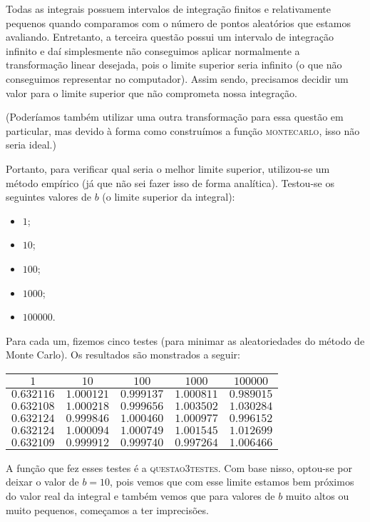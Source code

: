 \documentclass[12pt, a4paper, oneside]{article}
\begin{document}
Todas as integrais possuem intervalos de integração finitos e relativamente 
pequenos quando comparamos com o número de pontos aleatórios que estamos 
avaliando. Entretanto, a terceira questão possui um intervalo de integração
infinito e daí simplesmente não conseguimos aplicar normalmente a transformação
linear desejada, pois o limite superior seria infinito (o que não conseguimos
representar no computador). Assim sendo, precisamos decidir um valor para o limite
superior que não comprometa nossa integração.

(Poderíamos também utilizar uma outra transformação para essa questão em particular,
mas devido à forma como construímos a função \textsc{montecarlo}, isso não seria
ideal.)

Portanto, para verificar qual seria o melhor limite superior, utilizou-se um 
método empírico (já que não sei fazer isso de forma analítica). Testou-se 
os seguintes valores de $b$ (o limite superior da integral):
\begin{itemize}
\item $1$;
\item $10$;
\item $100$;
\item $1000$;
\item $100000$.
\end{itemize}

Para cada um, fizemos cinco testes (para minimar as aleatoriedades do método de
Monte Carlo). Os resultados são monstrados a seguir:

\begin{center}
\begin{tabular}{|| c c c c c ||}
\hline
$1$ & $10$ & $100$ & $1000$ & $100000$ \\ [0.5ex]
\hline\hline
$0.632116$ & $1.000121$ & $0.999137$ & $1.000811$ & $0.989015$ \\ [0.1ex]
\hline
$0.632108$ & $1.000218$ & $0.999656$ & $1.003502$ & $1.030284$ \\ [0.1ex]
\hline
$0.632124$ & $0.999846$ & $1.000460$ & $1.000977$ & $0.996152$ \\ [0.1ex]
\hline
$0.632124$ & $1.000094$ & $1.000749$ & $1.001545$ & $1.012699$ \\ [0.1ex]
\hline
$0.632109$ & $0.999912$ & $0.999740$ & $0.997264$ & $1.006466$ \\ [1ex]
\hline
\end{tabular}
\end{center}

A função que fez esses testes é a \textsc{questao3testes}. Com base nisso,
optou-se por deixar o valor de $b=10$, pois vemos que com esse limite estamos
bem próximos do valor real da integral e também vemos que para valores de 
$b$ muito altos ou muito pequenos, começamos a ter imprecisões.

\end{document}
